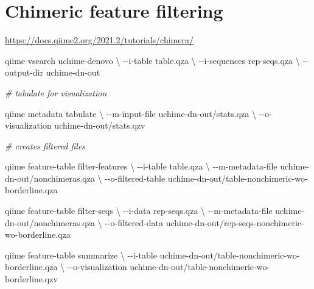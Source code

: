 \documentclass[
]{book}
\newenvironment{Shaded}{\begin{snugshade}}{\end{snugshade}}
\newcommand{\CommentTok}[1]{\textcolor[rgb]{0.56,0.35,0.01}{\textit{#1}}}
\newcommand{\DataTypeTok}[1]{\textcolor[rgb]{0.13,0.29,0.53}{#1}}
\newcommand{\ExtensionTok}[1]{#1}
\newcommand{\NormalTok}[1]{#1}
\begin{document}
\hypertarget{chimeric-feature-filtering}{%
\section{Chimeric feature filtering}\label{chimeric-feature-filtering}}

\url{https://docs.qiime2.org/2021.2/tutorials/chimera/}

\begin{Shaded}
\begin{Highlighting}[]
\ExtensionTok{qiime}\NormalTok{ vsearch uchime{-}denovo }\DataTypeTok{\textbackslash{}}
\NormalTok{{-}{-}i{-}table table.qza }\DataTypeTok{\textbackslash{}}
\NormalTok{{-}{-}i{-}sequences rep{-}seqs.qza }\DataTypeTok{\textbackslash{}}
\NormalTok{{-}{-}output{-}dir uchime{-}dn{-}out}

\CommentTok{\# tabulate for visualization}

\ExtensionTok{qiime}\NormalTok{ metadata tabulate }\DataTypeTok{\textbackslash{}}
\NormalTok{{-}{-}m{-}input{-}file uchime{-}dn{-}out/stats.qza }\DataTypeTok{\textbackslash{}}
\NormalTok{{-}{-}o{-}visualization uchime{-}dn{-}out/stats.qzv}

\CommentTok{\# creates filtered files}

\ExtensionTok{qiime}\NormalTok{ feature{-}table filter{-}features }\DataTypeTok{\textbackslash{}}
\NormalTok{{-}{-}i{-}table table.qza }\DataTypeTok{\textbackslash{}}
\NormalTok{{-}{-}m{-}metadata{-}file uchime{-}dn{-}out/nonchimeras.qza }\DataTypeTok{\textbackslash{}}
\NormalTok{{-}{-}o{-}filtered{-}table uchime{-}dn{-}out/table{-}nonchimeric{-}wo{-}borderline.qza }

\ExtensionTok{qiime}\NormalTok{ feature{-}table filter{-}seqs }\DataTypeTok{\textbackslash{}}
\NormalTok{{-}{-}i{-}data rep{-}seqs.qza }\DataTypeTok{\textbackslash{}}
\NormalTok{{-}{-}m{-}metadata{-}file uchime{-}dn{-}out/nonchimeras.qza }\DataTypeTok{\textbackslash{}}
\NormalTok{{-}{-}o{-}filtered{-}data uchime{-}dn{-}out/rep{-}seqs{-}nonchimeric{-}wo{-}borderline.qza }

\ExtensionTok{qiime}\NormalTok{ feature{-}table summarize }\DataTypeTok{\textbackslash{}}
\NormalTok{{-}{-}i{-}table uchime{-}dn{-}out/table{-}nonchimeric{-}wo{-}borderline.qza }\DataTypeTok{\textbackslash{}}
\NormalTok{{-}{-}o{-}visualization uchime{-}dn{-}out/table{-}nonchimeric{-}wo{-}borderline.qzv}
\end{Highlighting}
\end{Shaded}


  
\end{document}

